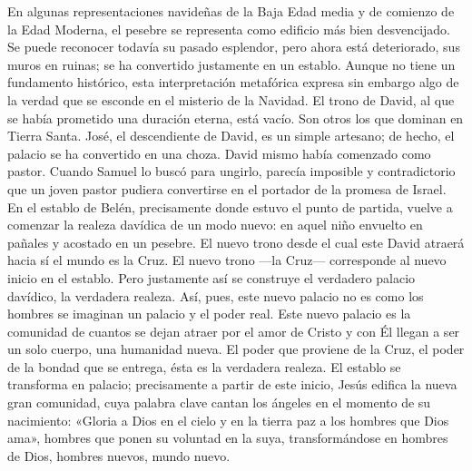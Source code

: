 En algunas representaciones navideñas de la Baja Edad media y de
comienzo de la Edad Moderna, el pesebre se representa como edificio más
bien desvencijado. Se puede reconocer todavía su pasado esplendor, pero
ahora está deteriorado, sus muros en ruinas; se ha convertido justamente
en un establo. Aunque no tiene un fundamento histórico, esta
interpretación metafórica expresa sin embargo algo de la verdad que se
esconde en el misterio de la Navidad. El trono de David, al que se había
prometido una duración eterna, está vacío. Son otros los que dominan en
Tierra Santa. José, el descendiente de David, es un simple artesano; de
hecho, el palacio se ha convertido en una choza. David mismo había
comenzado como pastor. Cuando Samuel lo buscó para ungirlo, parecía
imposible y contradictorio que un joven pastor pudiera convertirse en el
portador de la promesa de Israel. En el establo de Belén, precisamente
donde estuvo el punto de partida, vuelve a comenzar la realeza davídica
de un modo nuevo: en aquel niño envuelto en pañales y acostado en un
pesebre. El nuevo trono desde el cual este David atraerá hacia sí el
mundo es la Cruz. El nuevo trono ---la Cruz--- corresponde al nuevo
inicio en el establo. Pero justamente así se construye el verdadero
palacio davídico, la verdadera realeza. Así, pues, este nuevo palacio no
es como los hombres se imaginan un palacio y el poder real. Este nuevo
palacio es la comunidad de cuantos se dejan atraer por el amor de Cristo
y con Él llegan a ser un solo cuerpo, una humanidad nueva. El poder que
proviene de la Cruz, el poder de la bondad que se entrega, ésta es la
verdadera realeza. El establo se transforma en palacio; precisamente a
partir de este inicio, Jesús edifica la nueva gran comunidad, cuya
palabra clave cantan los ángeles en el momento de su nacimiento: «Gloria
a Dios en el cielo y en la tierra paz a los hombres que Dios ama»,
hombres que ponen su voluntad en la suya, transformándose en hombres de
Dios, hombres nuevos, mundo nuevo.

